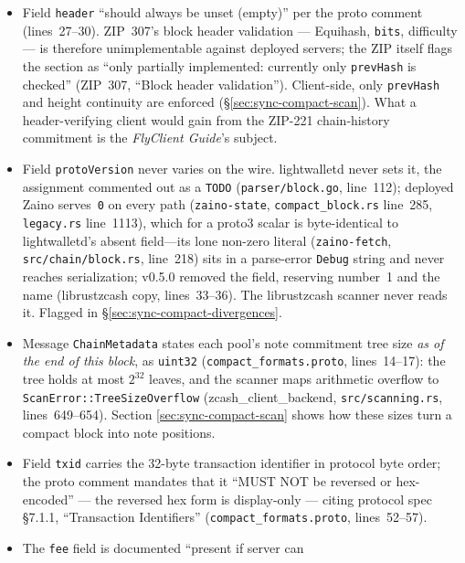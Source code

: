 \documentclass[11pt,a4paper]{article}
\theoremstyle{definition}
\begin{document}
\begin{itemize}
\item Field \texttt{header} ``should always be unset (empty)'' per the
  proto comment (lines~27--30). ZIP~307's block
  header validation --- Equihash, \texttt{bits}, difficulty --- is therefore
  unimplementable against deployed servers; the ZIP itself flags the section
  as ``only partially implemented: currently only \texttt{prevHash} is
  checked'' (ZIP~307, ``Block header validation''). Client-side, only
  \texttt{prevHash} and height continuity are enforced
  (\S\ref{sec:sync-compact-scan}). What a header-verifying client would
  gain from the ZIP-221 chain-history commitment is the \emph{FlyClient
  Guide}'s subject.
\item Field \texttt{protoVersion} never varies on the wire.
  \textsf{lightwalletd} never sets it, the assignment commented out as a
  \texttt{TODO} (\texttt{parser/block.go}, line~112); deployed
  \textsf{Zaino} serves~\texttt{0} on every path (\texttt{zaino-state},
  \texttt{compact\_block.rs} line~285, \texttt{legacy.rs} line~1113),
  which for a proto3 scalar is byte-identical to lightwalletd's absent
  field---its lone non-zero literal (\texttt{zaino-fetch},
  \texttt{src/chain/block.rs}, line~218) sits in a parse-error
  \texttt{Debug} string and never reaches serialization; v0.5.0 removed
  the field, reserving number~1 and the name (\textsf{librustzcash} copy,
  lines~33--36). The \textsf{librustzcash} scanner never reads it. Flagged
  in \S\ref{sec:sync-compact-divergences}.
\item Message \texttt{ChainMetadata} states each pool's note commitment tree
  size \emph{as of the end of this block}, as \texttt{uint32}
  (\texttt{compact\_formats.proto}, lines~14--17): the tree holds at most
  $2^{32}$ leaves, and the scanner maps arithmetic overflow to
  \texttt{ScanError::TreeSizeOverflow} (\textsf{zcash\_client\_backend},
  \texttt{src/scanning.rs}, lines~649--654). Section
  \ref{sec:sync-compact-scan} shows how these sizes turn a compact block
  into note positions.
\item Field \texttt{txid} carries the 32-byte transaction identifier in
  protocol byte order; the proto comment mandates that it ``MUST NOT be
  reversed or hex-encoded'' --- the reversed hex form is display-only ---
  citing protocol spec \S7.1.1, ``Transaction Identifiers''
  (\texttt{compact\_formats.proto}, lines~52--57).
\item The \texttt{fee} field is documented ``present if server can

\end{itemize}
\end{document}
